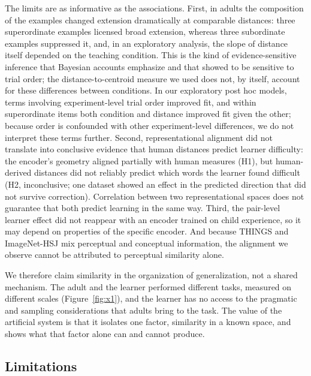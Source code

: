 \documentclass[11pt]{article}
\begin{document}
The limits are as informative as the associations. First, in adults the composition of the examples changed extension dramatically at comparable distances: three superordinate examples licensed broad extension, whereas three subordinate examples suppressed it, and, in an exploratory analysis, the slope of distance itself depended on the teaching condition. This is the kind of evidence-sensitive inference that Bayesian accounts emphasize \parencite{xu2007} and that \textcite{lewis2018} showed to be sensitive to trial order; the distance-to-centroid measure we used does not, by itself, account for these differences between conditions. In our exploratory post hoc models, terms involving experiment-level trial order improved fit, and within superordinate items both condition and distance improved fit given the other; because order is confounded with other experiment-level differences, we do not interpret these terms further. Second, representational alignment did not translate into conclusive evidence that human distances predict learner difficulty: the encoder's geometry aligned partially with human measures (H1), but human-derived distances did not reliably predict which words the learner found difficult (H2, inconclusive; one dataset showed an effect in the predicted direction that did not survive correction). Correlation between two representational spaces does not guarantee that both predict learning in the same way. Third, the pair-level learner effect did not reappear with an encoder trained on child experience, so it may depend on properties of the specific encoder. And because THINGS and ImageNet-HSJ mix perceptual and conceptual information, the alignment we observe cannot be attributed to perceptual similarity alone.

We therefore claim similarity in the organization of generalization, not a shared mechanism. The adult and the learner performed different tasks, measured on different scales (Figure~\ref{fig:x1}), and the learner has no access to the pragmatic and sampling considerations that adults bring to the task. The value of the artificial system is that it isolates one factor, similarity in a known space, and shows what that factor alone can and cannot produce.

\subsection{Limitations}
\end{document}
